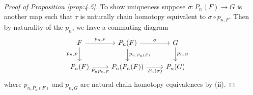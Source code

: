 \begin{proof}[Proof of Proposition \ref{prop:4.5}]
    
    To show uniqueness suppose $\sigma:P_n(F)\rightarrow G$ is another map such that $\tau$ is naturally chain homotopy equivalent to $\sigma\circ p_{n,F}$. Then by naturality of the $p_n$, we have a commuting diagram
    \[\begin{tikzcd}
    	F & {P_n(F)} & G \\
    	{P_n(F)} & {P_n(P_n(F))} & {P_n(G)}
    	\arrow["{p_{n,F}}"', from=1-1, to=2-1]
    	\arrow["{P_np_{n,F}}"', from=2-1, to=2-2]
    	\arrow["{p_{n,F}}", from=1-1, to=1-2]
    	\arrow["{p_{n,P_n(F)}}", from=1-2, to=2-2]
    	\arrow["\sigma", from=1-2, to=1-3]
    	\arrow["{p_{n,G}}", from=1-3, to=2-3]
    	\arrow["{P_n(\sigma)}"', from=2-2, to=2-3]
    \end{tikzcd}\]
    where $p_{n,P_n(F)}$ and $p_{n,G}$ are natural chain homotopy equivalences by (ii). 
    

\end{proof}
